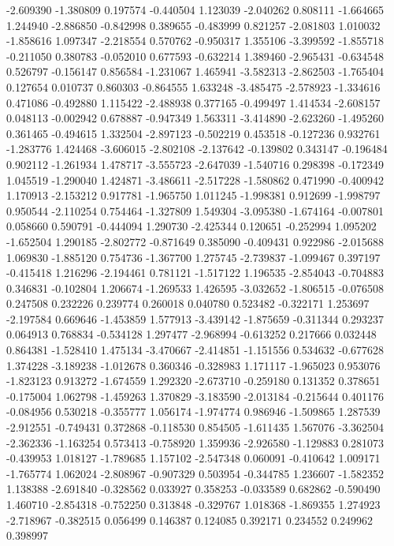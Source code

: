 -2.609390
-1.380809
0.197574
-0.440504
1.123039
-2.040262
0.808111
-1.664665
1.244940
-2.886850
-0.842998
0.389655
-0.483999
0.821257
-2.081803
1.010032
-1.858616
1.097347
-2.218554
0.570762
-0.950317
1.355106
-3.399592
-1.855718
-0.211050
0.380783
-0.052010
0.677593
-0.632214
1.389460
-2.965431
-0.634548
0.526797
-0.156147
0.856584
-1.231067
1.465941
-3.582313
-2.862503
-1.765404
0.127654
0.010737
0.860303
-0.864555
1.633248
-3.485475
-2.578923
-1.334616
0.471086
-0.492880
1.115422
-2.488938
0.377165
-0.499497
1.414534
-2.608157
0.048113
-0.002942
0.678887
-0.947349
1.563311
-3.414890
-2.623260
-1.495260
0.361465
-0.494615
1.332504
-2.897123
-0.502219
0.453518
-0.127236
0.932761
-1.283776
1.424468
-3.606015
-2.802108
-2.137642
-0.139802
0.343147
-0.196484
0.902112
-1.261934
1.478717
-3.555723
-2.647039
-1.540716
0.298398
-0.172349
1.045519
-1.290040
1.424871
-3.486611
-2.517228
-1.580862
0.471990
-0.400942
1.170913
-2.153212
0.917781
-1.965750
1.011245
-1.998381
0.912699
-1.998797
0.950544
-2.110254
0.754464
-1.327809
1.549304
-3.095380
-1.674164
-0.007801
0.058660
0.590791
-0.444094
1.290730
-2.425344
0.120651
-0.252994
1.095202
-1.652504
1.290185
-2.802772
-0.871649
0.385090
-0.409431
0.922986
-2.015688
1.069830
-1.885120
0.754736
-1.367700
1.275745
-2.739837
-1.099467
0.397197
-0.415418
1.216296
-2.194461
0.781121
-1.517122
1.196535
-2.854043
-0.704883
0.346831
-0.102804
1.206674
-1.269533
1.426595
-3.032652
-1.806515
-0.076508
0.247508
0.232226
0.239774
0.260018
0.040780
0.523482
-0.322171
1.253697
-2.197584
0.669646
-1.453859
1.577913
-3.439142
-1.875659
-0.311344
0.293237
0.064913
0.768834
-0.534128
1.297477
-2.968994
-0.613252
0.217666
0.032448
0.864381
-1.528410
1.475134
-3.470667
-2.414851
-1.151556
0.534632
-0.677628
1.374228
-3.189238
-1.012678
0.360346
-0.328983
1.171117
-1.965023
0.953076
-1.823123
0.913272
-1.674559
1.292320
-2.673710
-0.259180
0.131352
0.378651
-0.175004
1.062798
-1.459263
1.370829
-3.183590
-2.013184
-0.215644
0.401176
-0.084956
0.530218
-0.355777
1.056174
-1.974774
0.986946
-1.509865
1.287539
-2.912551
-0.749431
0.372868
-0.118530
0.854505
-1.611435
1.567076
-3.362504
-2.362336
-1.163254
0.573413
-0.758920
1.359936
-2.926580
-1.129883
0.281073
-0.439953
1.018127
-1.789685
1.157102
-2.547348
0.060091
-0.410642
1.009171
-1.765774
1.062024
-2.808967
-0.907329
0.503954
-0.344785
1.236607
-1.582352
1.138388
-2.691840
-0.328562
0.033927
0.358253
-0.033589
0.682862
-0.590490
1.460710
-2.854318
-0.752250
0.313848
-0.329767
1.018368
-1.869355
1.274923
-2.718967
-0.382515
0.056499
0.146387
0.124085
0.392171
0.234552
0.249962
0.398997
